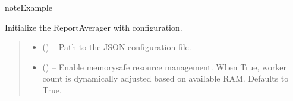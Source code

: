 \documentclass[a4paper,11pt,english,openany,oneside]{sphinxmanual}
\begin{document}
\begin{fulllineitems}
\begin{fulllineitems}
\begin{quote}
\begin{description}
\end{description}\end{quote}

\end{fulllineitems}


\begin{sphinxadmonition}{note}{Example}

\begin{sphinxVerbatim}[commandchars=\\\{\}]
  
\end{sphinxVerbatim}
\end{sphinxadmonition}

\begin{fulllineitems}
\label{\detokenize{modules/core:core.averager.ReportAverager.__init__}}
\pysigstartsignatures
\pysiglinewithargsret
{}
{\sphinxparamcomma {}}
{}
\pysigstopsignatures
\sphinxAtStartPar
Initialize the ReportAverager with configuration.
\begin{quote}\begin{description}
\begin{itemize}
\item {} 
\sphinxAtStartPar
{} () – Path to the JSON configuration file.

\item {} 
\sphinxAtStartPar
{} (\sphinxstyleliteralemphasis{\sphinxupquote{, }}) – Enable memory\sphinxhyphen{}safe resource management.
When True, worker count is dynamically adjusted based on available RAM.
Defaults to True.


\end{itemize}
\end{description}
\end{quote}
\end{fulllineitems}
\end{fulllineitems}
\end{document}
